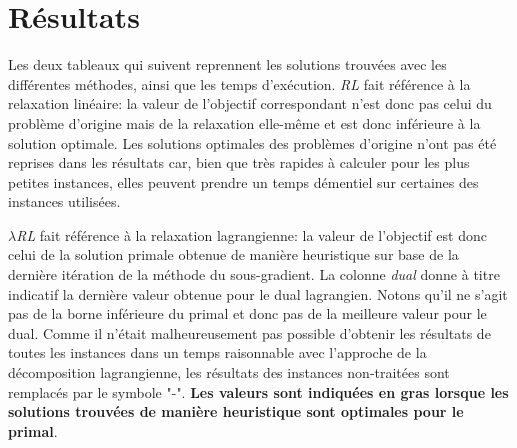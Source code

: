 \section{Résultats}

Les deux tableaux qui suivent reprennent les solutions trouvées avec les différentes méthodes,
ainsi que les temps d'exécution. \textit{RL} fait référence à la relaxation linéaire:
la valeur de l'objectif correspondant n'est donc pas celui du problème d'origine mais de la
relaxation elle-même et est donc inférieure à la solution optimale.
Les solutions optimales des problèmes d'origine n'ont pas été reprises dans les résultats car, bien
que très rapides à calculer pour les plus petites instances, elles peuvent prendre un temps
démentiel sur certaines des instances utilisées.

\textit{$\lambda$RL} fait référence à la relaxation lagrangienne: la valeur de l'objectif est donc
celui de la solution primale obtenue de manière heuristique sur base de la dernière itération
de la méthode du sous-gradient. La colonne \textit{dual} donne à titre indicatif la dernière valeur obtenue
pour le dual lagrangien. Notons qu'il ne s'agit pas de la borne inférieure du primal et donc pas de la
meilleure valeur pour le dual. Comme il n'était malheureusement pas possible d'obtenir les résultats de toutes les instances dans un temps raisonnable avec l'approche de la décomposition lagrangienne, les résultats des instances non-traitées sont remplacés par le symbole "-". \textbf{Les valeurs sont indiquées en gras lorsque les solutions trouvées de manière heuristique sont optimales pour le primal}.

